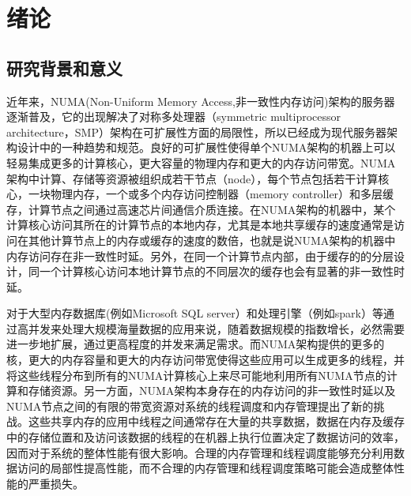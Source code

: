 
\chapter{绪论}
\label{chap:intro}


\section{研究背景和意义}
近年来，NUMA(Non-Uniform Memory Access,非一致性内存访问)\cite{feliu2012understanding}\cite{dashti2013traffic}架构的服务器逐渐普及，它的出现解决了对称多处理器（symmetric multiprocessor architecture，SMP）架构在可扩展性方面的局限性\cite{pusukuri2014shuffling}，所以已经成为现代服务器架构设计中的一种趋势和规范\cite{kashyap2017scalable}\cite{chabbi2016contention}\cite{chabbi2017efficient}。良好的可扩展性使得单个NUMA架构的机器上可以轻易集成更多的计算核心，更大容量的物理内存和更大的内存访问带宽。NUMA架构中计算、存储等资源被组织成若干节点（node），每个节点包括若干计算核心，一块物理内存，一个或多个内存访问控制器（memory controller）和多层缓存，计算节点之间通过高速芯片间通信介质连接。在NUMA架构的机器中，某个计算核心访问其所在的计算节点的本地内存，尤其是本地共享缓存的速度通常是访问在其他计算节点上的内存或缓存的速度的数倍，也就是说NUMA架构的机器中内存访问存在非一致性时延。另外，在同一个计算节点内部，由于缓存的的分层设计，同一个计算核心访问本地计算节点的不同层次的缓存也会有显著的非一致性时延\cite{chabbi2015high}。

对于大型内存数据库(例如Microsoft SQL server）\cite{MICROSOFT-SQL}和处理引擎\cite{SAP}\cite{zaharia2010spark}（例如spark）等通过高并发来处理大规模海量数据的应用来说，随着数据规模的指数增长，必然需要进一步地扩展，通过更高程度的并发来满足需求。而NUMA架构提供的更多的核，更大的内存容量和更大的内存访问带宽使得这些应用可以生成更多的线程，并将这些线程分布到所有的NUMA计算核心上来尽可能地利用所有NUMA节点的计算和存储资源。另一方面，NUMA架构本身存在的内存访问的非一致性时延以及NUMA节点之间的有限的带宽资源对系统的线程调度和内存管理提出了新的挑战\cite{wang2012performance}\cite{boyd2008corey}。这些共享内存的应用中线程之间通常存在大量的共享数据，数据在内存及缓存中的存储位置和及访问该数据的线程的在机器上执行位置决定了数据访问的效率，因而对于系统的整体性能有很大影响。合理的内存管理和线程调度能够充分利用数据访问的局部性提高性能，而不合理的内存管理和线程调度策略可能会造成整体性能的严重损失。

